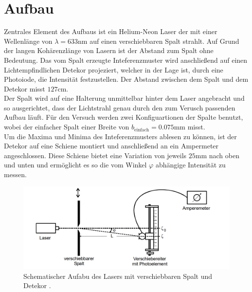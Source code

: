 \section{Aufbau}
Zentrales Element des Aufbaus ist ein Helium-Neon Laser der mit einer Wellenlänge von $\lambda = 633\si{\nano \meter}$ auf einen
verschiebbaren Spalt strahlt. Auf Grund der langen Kohärenzlänge von Lasern ist der Abstand zum Spalt ohne Bedeutung.
Das vom Spalt erzeugte Inteferenzmuster wird anschließend auf einen Lichtempfindlichen Detekor projeziert, 
welcher in der Lage ist, durch eine Photoiode, die Intensität festzustellen. Der Abstand zwischen dem Spalt und 
dem Detekor misst $127\si{\cm}$. 
\\
\newline
Der Spalt wird auf eine Halterung unmittelbar hinter dem Laser angebracht und so ausgerichtet, dass der Lichtstrahl 
genau durch den zum Verusch passenden Aufbau läuft. Für den Versuch werden zwei Konfiguartionen der Spalte benutzt, wobei der 
einfacher Spalt einer Breite von $b_{\text{einfach}}=0.075 \si{\mm}$ misst.
\\
\newline
Um die Maxima und Minima des Inteferenzmusters ablesen zu können, ist der Detekor auf eine Schiene montiert und anschließend an ein 
Ampermeter angeschlossen. 
Diese Schiene bietet eine Variation von jeweils $25 \si{\mm}$ nach oben und unten und ermöglicht es so die vom Winkel
$\varphi$ abhängige Intensität zu messen.
\begin{figure}
    \centering
    \includegraphics[width=\textwidth]{bilder/aufbau.png}
    \caption{Schematischer Aufabu des Lasers mit verschiebbaren Spalt und Detekor \cite{skript}.} 
    \label{fig:abb1}
\end{figure}
